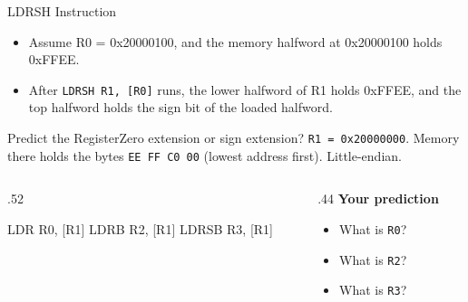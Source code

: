 \documentclass[9pt,aspectratio=169,xcolor=table]{beamer}
\begin{document}
{\begin{frame}[fragile]{LDRSH Instruction}
{%
	}
	\vspace{4mm}

	\begin{itemize}
		\item Assume R0 = 0x20000100, and the \alert{memory halfword} at 0x20000100 holds 0xFFEE.
		\item After \texttt{LDRSH R1, [R0]} runs, the lower halfword of R1 holds 0xFFEE, and the top halfword holds the sign bit of the loaded halfword.
	\end{itemize}
\end{frame}
}

{\beamerextras
\begin{frame}[fragile]{Predict the Register}{Zero extension or sign extension?}
    \leavevmode
    \texttt{R1 = 0x20000000}. Memory there holds the bytes \texttt{EE FF C0 00} (lowest address first). Little-endian.

    \vspace{2mm}
    \begin{columns}[T]
    \begin{column}{.52\textwidth}
\begin{asm}[basicstyle=\ttfamily\small]
LDR   R0, [R1]
LDRB  R2, [R1]
LDRSB R3, [R1]
\end{asm}
    \end{column}
    \begin{column}{.44\textwidth}
        \textbf{Your prediction}
        {\small
        \begin{itemize}\itemsep2pt
            \item What is \texttt{R0}?
            \item What is \texttt{R2}?
            \item What is \texttt{R3}?
        \end{itemize}}
    \end{column}
    \end{columns}

    \vspace{2mm}
\end{frame}
}
\end{document}
